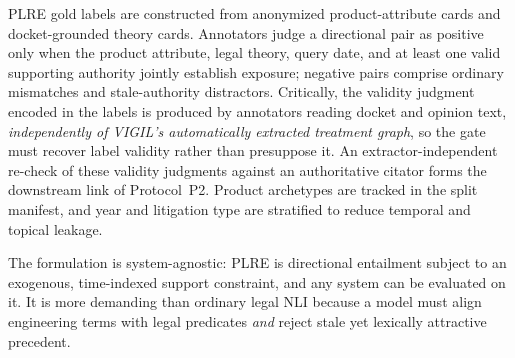 PLRE gold labels are constructed from anonymized product-attribute cards and docket-grounded theory cards. Annotators judge a directional pair as positive only when the product attribute, legal theory, query date, and at least one valid supporting authority jointly establish exposure; negative pairs comprise ordinary mismatches and stale-authority distractors. Critically, the validity judgment encoded in the labels is produced by annotators reading docket and opinion text, \emph{independently of VIGIL's automatically extracted treatment graph}, so the gate must recover label validity rather than presuppose it. An extractor-independent re-check of these validity judgments against an authoritative citator forms the downstream link of Protocol~P2. Product archetypes are tracked in the split manifest, and year and litigation type are stratified to reduce temporal and topical leakage.

The formulation is system-agnostic: PLRE is directional entailment subject to an exogenous, time-indexed support constraint, and any system can be evaluated on it. It is more demanding than ordinary legal NLI because a model must align engineering terms with legal predicates \emph{and} reject stale yet lexically attractive precedent.
